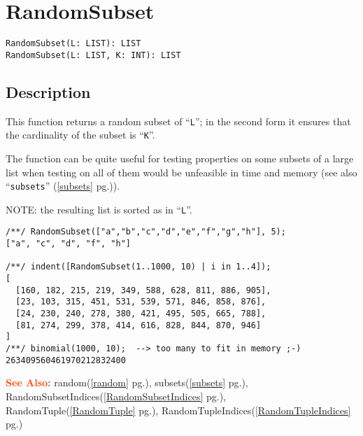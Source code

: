 \documentclass[a4paper]{mybook}
\newenvironment{command}{}{} %
\newcommand\SeeAlso{\par\textcolor{OrangeRed}{\textbf{\large See Also: }}}
\begin{document}
\section{RandomSubset}
\label{RandomSubset}
\begin{command} %


\begin{Verbatim}[label=syntax, rulecolor=\color{MidnightBlue},
frame=single]
RandomSubset(L: LIST): LIST
RandomSubset(L: LIST, K: INT): LIST
\end{Verbatim}


\subsection*{Description}

This function returns a random subset of ``\verb&L&''; in the second form
it ensures that the cardinality of the subset is ``\verb&K&''.
\par 
The function can be quite useful for testing properties on some
subsets of a large list when testing on all of them would be
unfeasible in time and memory (see also ``\verb&subsets&'' (\ref{subsets} pg.\pageref{subsets})).
\par 
NOTE: the resulting list is sorted as in ``\verb&L&''.
\begin{Verbatim}[label=example, rulecolor=\color{PineGreen}, frame=single]
/**/ RandomSubset(["a","b","c","d","e","f","g","h"], 5);
["a", "c", "d", "f", "h"]

/**/ indent([RandomSubset(1..1000, 10) | i in 1..4]);
[
  [160, 182, 215, 219, 349, 588, 628, 811, 886, 905],
  [23, 103, 315, 451, 531, 539, 571, 846, 858, 876],
  [24, 230, 240, 278, 380, 421, 495, 505, 665, 788],
  [81, 274, 299, 378, 414, 616, 828, 844, 870, 946]
]
/**/ binomial(1000, 10);  --> too many to fit in memory ;-)
263409560461970212832400
\end{Verbatim}


\SeeAlso %
  random(\ref{random} pg.\pageref{random}), 
    subsets(\ref{subsets} pg.\pageref{subsets}), 
    RandomSubsetIndices(\ref{RandomSubsetIndices} pg.\pageref{RandomSubsetIndices}), 
    RandomTuple(\ref{RandomTuple} pg.\pageref{RandomTuple}), 
    RandomTupleIndices(\ref{RandomTupleIndices} pg.\pageref{RandomTupleIndices})
\end{command} %
\end{document}
